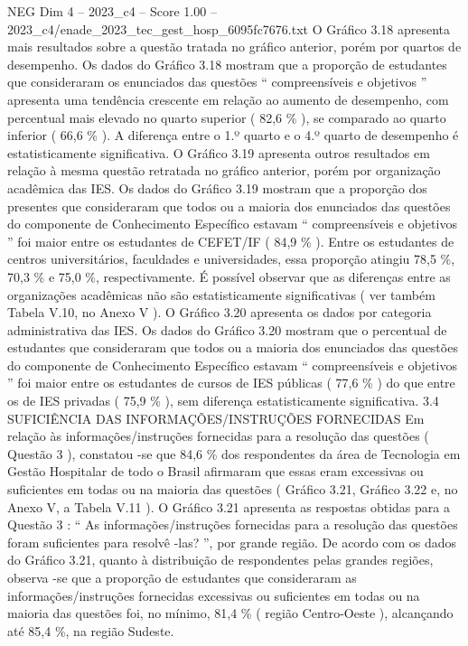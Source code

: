 \begin{textsample}{NEG Dim 4 – 2023\_c4 – Score 1.00 – 2023\_c4/enade\_2023\_tec\_gest\_hosp\_6095fc7676.txt}
O Gráfico 3.18 apresenta mais resultados sobre a questão tratada no gráfico anterior, porém por quartos de desempenho.
Os dados do Gráfico 3.18 mostram que a proporção de estudantes que consideraram os enunciados das questões “ compreensíveis e objetivos ” apresenta uma tendência crescente em relação ao aumento de desempenho, com percentual mais elevado no quarto superior ( 82,6 \% ), se comparado ao quarto inferior ( 66,6 \% ).
A diferença entre o 1.º quarto e o 4.º quarto de desempenho é estatisticamente significativa.
O Gráfico 3.19 apresenta outros resultados em relação à mesma questão retratada no gráfico anterior, porém por organização acadêmica das IES.
Os dados do Gráfico 3.19 mostram que a proporção dos presentes que consideraram que todos ou a maioria dos enunciados das questões do componente de Conhecimento Específico estavam “ compreensíveis e objetivos ” foi maior entre os estudantes de CEFET/IF ( 84,9 \% ).
Entre os estudantes de centros universitários, faculdades e universidades, essa proporção atingiu 78,5 \%, 70,3 \% e 75,0 \%, respectivamente.
É possível observar que as diferenças entre as organizações acadêmicas não são estatisticamente significativas ( ver também Tabela V.10, no Anexo V ).
O Gráfico 3.20 apresenta os dados por categoria administrativa das IES.
Os dados do Gráfico 3.20 mostram que o percentual de estudantes que consideraram que todos ou a maioria dos enunciados das questões do componente de Conhecimento Específico estavam “ compreensíveis e objetivos ” foi maior entre os estudantes de cursos de IES públicas ( 77,6 \% ) do que entre os de IES privadas ( 75,9 \% ), sem diferença estatisticamente significativa. 3.4 SUFICIÊNCIA DAS INFORMAÇÕES/INSTRUÇÕES FORNECIDAS Em relação às informações/instruções fornecidas para a resolução das questões ( Questão 3 ), constatou -se que 84,6 \% dos respondentes da área de Tecnologia em Gestão Hospitalar de todo o Brasil afirmaram que essas eram excessivas ou suficientes em todas ou na maioria das questões ( Gráfico 3.21, Gráfico 3.22 e, no Anexo V, a Tabela V.11 ).
O Gráfico 3.21 apresenta as respostas obtidas para a Questão 3 : “ As informações/instruções fornecidas para a resolução das questões foram suficientes para resolvê -las? ”, por grande região.
De acordo com os dados do Gráfico 3.21, quanto à distribuição de respondentes pelas grandes regiões, observa -se que a proporção de estudantes que consideraram as informações/instruções fornecidas excessivas ou suficientes em todas ou na maioria das questões foi, no mínimo, 81,4 \% ( região Centro-Oeste ), alcançando até 85,4 \%, na região Sudeste.

\end{textsample}
